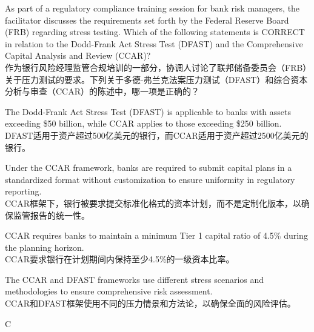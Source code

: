 \documentclass{article}
\newcounter{question} %
\begin{document}
\begin{question}
    As part of a regulatory compliance training session for bank risk managers, the facilitator discusses the requirements set forth by the Federal Reserve Board (FRB) regarding stress testing. Which of the following statements is CORRECT in relation to the Dodd-Frank Act Stress Test (DFAST) and the Comprehensive Capital Analysis and Review (CCAR)?\\
    作为银行风险经理监管合规培训的一部分，协调人讨论了联邦储备委员会（FRB）关于压力测试的要求。下列关于多德-弗兰克法案压力测试（DFAST）和综合资本分析与审查（CCAR）的陈述中，哪一项是正确的？
\end{question}
    
\begin{choices}
    \item The Dodd-Frank Act Stress Test (DFAST) is applicable to banks with assets exceeding \$50 billion, while CCAR applies to those exceeding \$250 billion. \\
    DFAST适用于资产超过500亿美元的银行，而CCAR适用于资产超过2500亿美元的银行。
    
    \item Under the CCAR framework, banks are required to submit capital plans in a standardized format without customization to ensure uniformity in regulatory reporting. \\
    CCAR框架下，银行被要求提交标准化格式的资本计划，而不是定制化版本，以确保监管报告的统一性。
    
    \item CCAR requires banks to maintain a minimum Tier 1 capital ratio of 4.5\% during the planning horizon. \\
    CCAR要求银行在计划期间内保持至少4.5\%的一级资本比率。
    
    \item The CCAR and DFAST frameworks use different stress scenarios and methodologies to ensure comprehensive risk assessment. \\
    CCAR和DFAST框架使用不同的压力情景和方法论，以确保全面的风险评估。
\end{choices}
    
\begin{correctanswer}
    C
\end{correctanswer}
    
\end{document}

